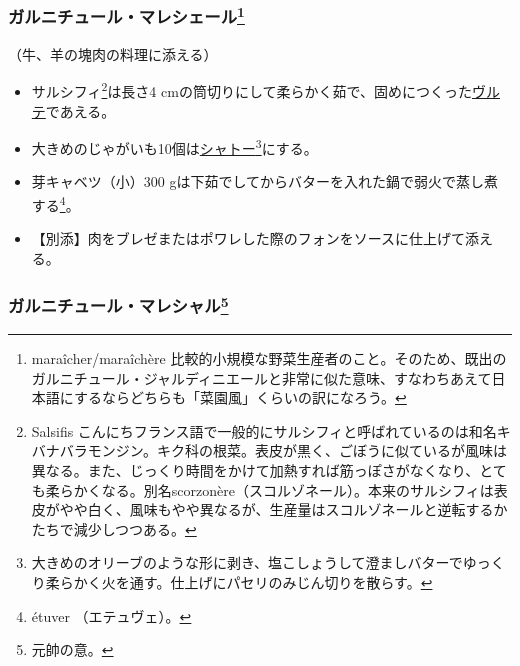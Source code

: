 \begin{recette}
\atoaki{}

\hypertarget{garniture-a-la-maraichere}{%
\subsubsection[ガルニチュール・マレシェール]{\texorpdfstring{ガルニチュール・マレシェール\footnote{maraîcher/maraîchère
  比較的小規模な野菜生産者のこと。そのため、既出のガルニチュール・ジャルディニエールと非常に似た意味、すなわちあえて日本語にするならどちらも「菜園風」くらいの訳になろう。}}{ガルニチュール・マレシェール}}\label{garniture-a-la-maraichere}}



（牛、羊の塊肉の料理に添える）

\begin{itemize}
\item
  サルシフィ\footnote{Salsifis
    こんにちフランス語で一般的にサルシフィと呼ばれているのは和名キバナバラモンジン。キク科の根菜。表皮が黒く、ごぼうに似ているが風味は異なる。また、じっくり時間をかけて加熱すれば筋っぽさがなくなり、とても柔らかくなる。別名scorzonère（スコルゾネール）。本来のサルシフィは表皮がやや白く、風味もやや異なるが、生産量はスコルゾネールと逆転するかたちで減少しつつある。}は長さ4
  cmの筒切りにして柔らかく茹で、固めにつくった\protect\hyperlink{veloute}{ヴルテ}であえる。
\item
  大きめのじゃがいも10個は\protect\hyperlink{pommes-de-terre-chateau}{シャトー}\footnote{大きめのオリーブのような形に剥き、塩こしょうして澄ましバターでゆっくり柔らかく火を通す。仕上げにパセリのみじん切りを散らす。}にする。
\item
  芽キャベツ（小）300
  gは下茹でしてからバターを入れた鍋で弱火で蒸し煮する\footnote{étuver
    （エテュヴェ）。}。
\item
  【別添】肉をブレゼまたはポワレした際のフォンをソースに仕上げて添える。
\end{itemize}

\atoaki{}

\hypertarget{garniture-marechal}{%
\subsubsection[ガルニチュール・マレシャル]{\texorpdfstring{ガルニチュール・マレシャル\footnote{元帥の意。}}{ガルニチュール・マレシャル}}\label{garniture-marechal}}


\end{recette}
